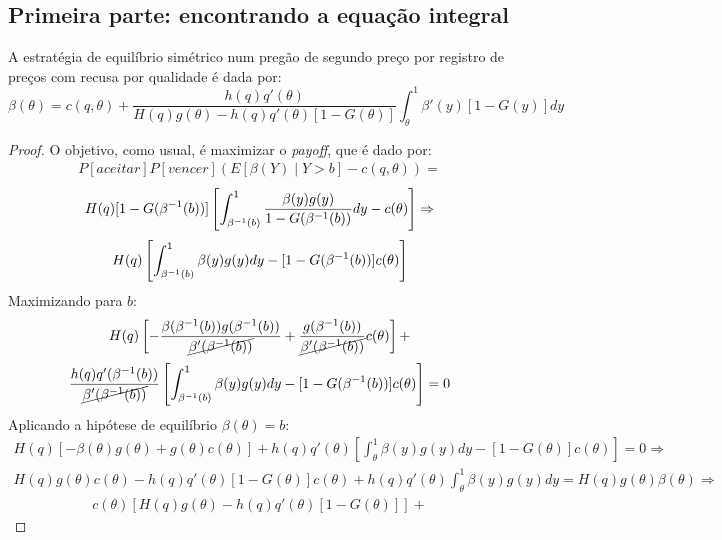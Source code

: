 \subsection{Primeira parte: encontrando a equação integral}
\begin{lema}
	\label{lema:nash-pregao-segundo-preco-qualidade}
	A estratégia de equilíbrio simétrico num pregão de segundo preço por registro de preços com recusa por qualidade é dada por:
	\begin{equation}
		\beta(\theta) = c(q, \theta) + \frac{h(q)q'(\theta)}{H(q)g(\theta)-h(q)q'(\theta)[1-G(\theta)]} \int_{\theta}^1 \beta'(y)[1-G(y)]dy
	\end{equation}
\end{lema}
\begin{proof}
	O objetivo, como usual, é maximizar o \emph{payoff}, que é dado por:
	\begin{align*}
		P[aceitar]P[vencer](E[\beta(Y) \mid Y > b]-c(q,\theta)) = 
	\end{align*}
	\begin{align*}
		H(q)[1-G(\beta^{-1}(b))] \left[ \int_{\beta^{-1}(b)}^1 \frac{\beta(y)g(y)}{1-G(\beta^{-1}(b))}dy - c(\theta) \right] \Rightarrow
	\end{align*}
	\begin{align*}
		H(q) \left[ \int_{\beta^{-1}(b)}^1 \beta(y)g(y)dy - [1-G(\beta^{-1}(b))]c(\theta) \right]
	\end{align*}
	Maximizando para $b$:
	\begin{align*}
		H(q) \left[ -\frac{\beta(\beta^{-1}(b))g(\beta^{-1}(b))}{\cancel{\beta'(\beta^{-1}(b))}} + \frac{g(\beta^{-1}(b))}{\cancel{\beta'(\beta^{-1}(b))}}c(\theta) \right] +
	\end{align*}
	\begin{align*}
		\frac{h(q)q'(\beta^{-1}(b))}{\cancel{\beta'(\beta^{-1}(b))}} \left[ \int_{\beta^{-1}(b)}^1 \beta(y)g(y)dy - [1-G(\beta^{-1}(b))]c(\theta) \right] = 0
	\end{align*}
	Aplicando a hipótese de equilíbrio $\beta(\theta) = b$:
	\begin{align*}
		H(q) \left[ -\beta(\theta)g(\theta) + g(\theta)c(\theta) \right] + h(q)q'(\theta) \left[ \int_{\theta}^1 \beta(y)g(y)dy - [1-G(\theta)]c(\theta) \right] = 0 \Rightarrow
	\end{align*}
	\begin{align*}
		H(q)g(\theta)c(\theta)-h(q)q'(\theta)[1-G(\theta)]c(\theta) + h(q)q'(\theta) \int_{\theta}^1 \beta(y)g(y)dy = H(q)g(\theta)\beta(\theta) \Rightarrow
	\end{align*}
	\begin{align*}
		c(\theta)[H(q)g(\theta)-h(q)q'(\theta)[1-G(\theta)]] +

\end{align*}
\end{proof}
